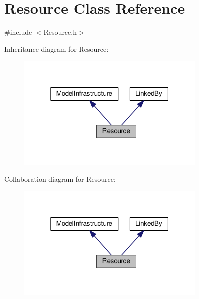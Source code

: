 \hypertarget{class_resource}{}\section{Resource Class Reference}
\label{class_resource}


{\ttfamily \#include $<$Resource.\+h$>$}



Inheritance diagram for Resource\+:
\nopagebreak
\begin{figure}[H]
\begin{center}
\leavevmode
\includegraphics[width=256pt]{class_resource__inherit__graph}
\end{center}
\end{figure}


Collaboration diagram for Resource\+:
\nopagebreak
\begin{figure}[H]
\begin{center}
\leavevmode
\includegraphics[width=256pt]{class_resource__coll__graph}
\end{center}
\end{figure}
